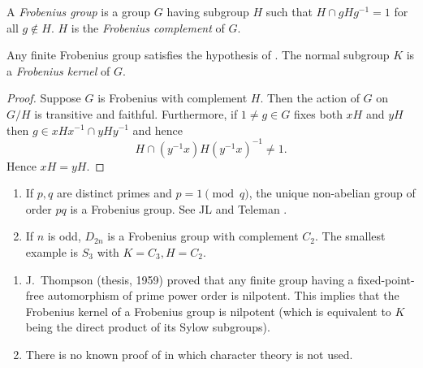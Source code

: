 \documentclass[a4paper]{article}
\theoremstyle{definition}
\begin{document}
\begin{definition}
  A \emph{Frobenius group} is a group \(G\) having subgroup \(H\) such that \(H \cap gHg^{-1} = 1\) for all \(g \notin H\). \(H\) is the \emph{Frobenius complement} of \(G\).
\end{definition}

\begin{proposition}
  Any finite Frobenius group satisfies the hypothesis of . The normal subgroup \(K\) is a \emph{Frobenius kernel} of \(G\).
\end{proposition}

\begin{proof}
  Suppose \(G\) is Frobenius with complement \(H\). Then the action of \(G\) on \(G/H\) is transitive and faithful. Furthermore, if \(1 \neq g \in G\) fixes both \(xH\) and \(yH\) then \(g \in xHx^{-1} \cap yHy^{-1}\) and hence
  \[
    H \cap (y^{-1}x) H (y^{-1} x)^{-1} \neq 1.
  \]
  Hence \(xH = yH\).
\end{proof}

\begin{eg}\leavevmode
  \begin{enumerate}
  \item If \(p, q\) are distinct primes and \(p = 1 \pmod q\), the unique non-abelian group of order \(pq\) is a Frobenius group. See JL  and Teleman .
  \item If \(n\) is odd, \(D_{2n}\) is a Frobenius group with complement \(C_2\). The smallest example is \(S_3\) with \(K = C_3, H = C_2\).
  \end{enumerate}
\end{eg}

\begin{remark}\leavevmode
  \begin{enumerate}
  \item J.\ Thompson (thesis, 1959) proved that any finite group having a fixed-point-free automorphism of prime power order is nilpotent. This implies that the Frobenius kernel of a Frobenius group is nilpotent (which is equivalent to \(K\) being the direct product of its Sylow subgroups).
  \item There is no known proof of  in which character theory is not used.
  \end{enumerate}
\end{remark}
\end{document}
